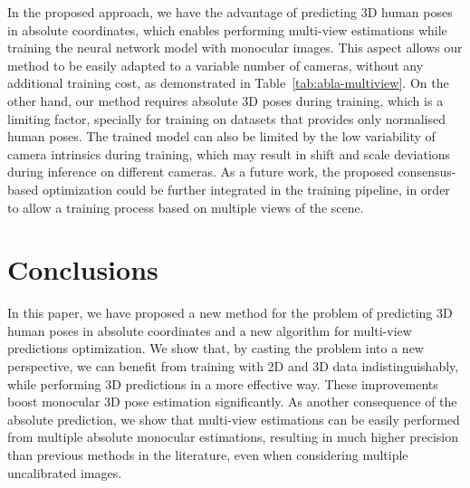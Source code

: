 \documentclass[10pt,twocolumn,letterpaper]{article}
\newcommand{\revb}[1]{{#1}}
\begin{document}
\revb{In the proposed approach, we have the advantage of predicting 3D human poses in absolute coordinates, which enables performing multi-view estimations while training the neural network model with monocular images. This aspect allows our method to be easily adapted to a variable number of cameras, without any additional training cost, as demonstrated in Table~\ref{tab:abla-multiview}. On the other hand, our method requires absolute 3D poses during training, which is a limiting factor, specially for training on datasets that provides only normalised human poses. The trained model can also be limited by the low variability of camera intrinsics during training, which may result in shift and scale deviations during inference on different cameras. As a future work, the proposed consensus-based optimization could be further integrated in the training pipeline, in order to allow a training process based on multiple views of the scene.}





\section{Conclusions}
\label{sec:conclusions}

In this paper, we have proposed a new method for the problem of predicting 3D
human poses in absolute coordinates and a new algorithm for multi-view
predictions optimization.
We show that, by casting the problem into a new perspective, we can benefit
from training with 2D and 3D data indistinguishably, while performing 3D
predictions in a more effective way. These improvements boost monocular 3D pose
estimation significantly. As another consequence of the absolute prediction, we
show that multi-view estimations can be easily performed from multiple absolute
monocular estimations, resulting in much higher precision than previous methods
in the literature, even when considering multiple uncalibrated images.









{
  \small
  
  
}
\end{document}
